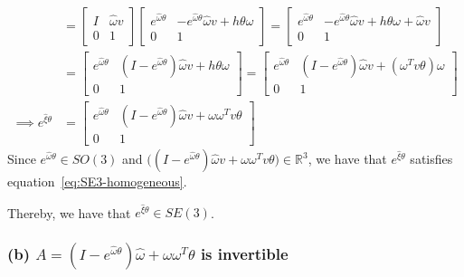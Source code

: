 \begin{align*}
      \\ & =
      \begin{bmatrix}
            I & \hat \omega v \\
            0 & 1
      \end{bmatrix}
      \begin{bmatrix}
            e^{\hat \omega \theta}
              &
            -e^{\hat \omega \theta} \hat \omega v + h \theta \omega
            \\
            0 & 1
      \end{bmatrix}
      =
      \begin{bmatrix}
            e^{\hat \omega \theta}
              &
            -e^{\hat \omega \theta} \hat \omega v + h \theta \omega + \hat \omega v
            \\
            0 & 1
      \end{bmatrix}
      \\ & =
      \begin{bmatrix}
            e^{\hat \omega \theta}
              &
            (I - e^{\hat \omega \theta}) \hat \omega v + h \theta \omega
            \\
            0 & 1
      \end{bmatrix}
      =
      \begin{bmatrix}
            e^{\hat \omega \theta}
              &
            (I - e^{\hat \omega \theta}) \hat \omega v + (\omega^T v \theta) \omega
            \\
            0 & 1
      \end{bmatrix}
      \\
      \implies
      e^{\hat{\xi} \theta}
       & =
      \begin{bmatrix}
            e^{\hat \omega \theta}
              &
            (I - e^{\hat \omega \theta}) \hat \omega v + \omega \omega^T v \theta
            \\
            0 & 1
      \end{bmatrix}
\end{align*}
Since \( e^{\hat \omega \theta} \in SO(3) \) and \( \Big( (I - e^{\hat \omega \theta}) \hat \omega v + \omega \omega^T v \theta \Big) \in \mathbb{R}^3 \), we have that \( e^{\hat{\xi} \theta} \) satisfies equation~\eqref{eq:SE3-homogeneous}.

Thereby, we have that \underline{\( e^{\hat{\xi} \theta} \in SE(3) \)}.

\clearpage
\subsubsection*{(b) \( A = \left(I-e^{\hat{\omega} \theta}\right) \hat{\omega}+\omega \omega^{T} \theta \) is invertible}

